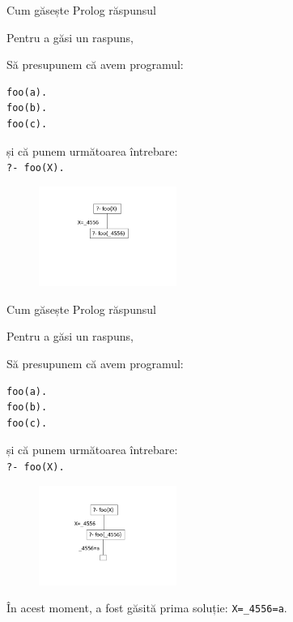 \documentclass[xcolor=x11names,compress,10pt]{beamer}
\begin{document}

\begin{frame}[fragile]{Cum găsește Prolog răspunsul}

Pentru a găsi un raspuns, 

\medskip 
\begin{example}
\begin{multicols}{2}
Să presupunem că avem programul: 
\begin{verbatim}
foo(a). 
foo(b). 
foo(c).
\end{verbatim}
și că punem următoarea întrebare: \\
{\color{blue}\texttt{?- foo(X).}}
\columnbreak
\begin{figure}[h]
    \includegraphics[width=0.4\textwidth]{prolog/foo1}
\end{figure}
\end{multicols}
\end{example}



\end{frame}

\addtocounter{framenumber}{-1}
\begin{frame}[fragile]{Cum găsește Prolog răspunsul}


Pentru a găsi un raspuns, 

\medskip
\begin{example}
\begin{multicols}{2}
Să presupunem că avem programul: 
\begin{verbatim}
foo(a). 
foo(b). 
foo(c).
\end{verbatim}
și că punem următoarea întrebare: \\
{\color{blue}\texttt{?- foo(X).}}
\columnbreak
\begin{figure}[h]
    \includegraphics[width=0.4\textwidth]{prolog/foo2}
\end{figure}
\end{multicols}
\end{example}
\medskip

\^{I}n acest moment, a fost găsită  prima soluție: \texttt{X=\_4556=a}.
\end{frame}
\end{document}
